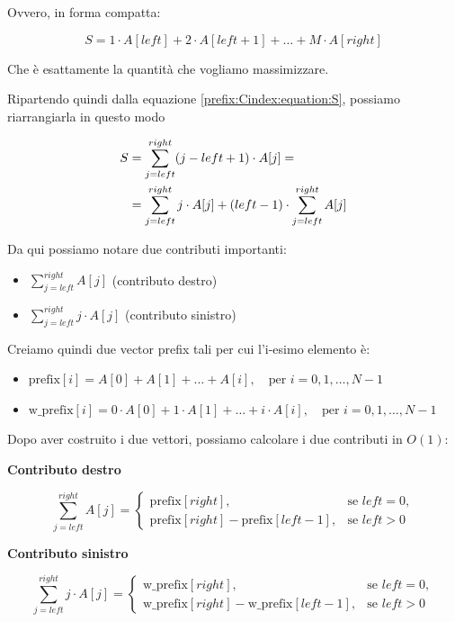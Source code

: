 Ovvero, in forma compatta:

\begin{equation}
	S = 1 \cdot A[left] + 2 \cdot A[left+1] + \dots + M \cdot A[right]
\end{equation}

Che è esattamente la quantità che vogliamo massimizzare.

\vspace{0.5cm}

Ripartendo quindi dalla equazione \ref{prefix:Cindex:equation:S}, possiamo riarrangiarla in questo modo

\begin{align}
	S &= \sum_{j = left}^{right} (j - left + 1) \cdot A[j] = \notag \\
	&= \sum_{j = left}^{right} j \cdot A[j] + (left - 1) \cdot \sum_{j = left}^{right} A[j]
\end{align}

Da qui possiamo notare due contributi importanti:
\begin{itemize}
	\item $\sum_{j = left}^{right} A[j]$ (contributo destro)
	\item $\sum_{j = left}^{right} j \cdot A[j]$ (contributo sinistro)
\end{itemize}

Creiamo quindi due vector prefix tali per cui l'i-esimo elemento è:
\begin{itemize}
	\item \(\text{prefix}[i] = A[0] + A[1] + \dots + A[i], \quad \text{per } i = 0, 1, \dots, N-1\)
	
	\item \(\text{w\_prefix}[i] = 0 \cdot A[0] + 1 \cdot A[1] + \dots + i \cdot A[i], \quad \text{per } i = 0, 1, \dots, N-1\)
\end{itemize}

Dopo aver costruito i due vettori, possiamo calcolare i due contributi in $O(1)$:

\medskip
\textbf{Contributo destro}

\[
\sum_{j = left}^{right} A[j] =
\begin{cases}
	\text{prefix}[right], & \text{se } left = 0,\\
	\text{prefix}[right] - \text{prefix}[left-1], & \text{se } left > 0
\end{cases}
\]

\textbf{Contributo sinistro}

\[
\sum_{j = left}^{right} j \cdot A[j] =
\begin{cases}
	\text{w\_prefix}[right], & \text{se } left = 0,\\
	\text{w\_prefix}[right] - \text{w\_prefix}[left-1], & \text{se } left > 0
\end{cases}
\]

